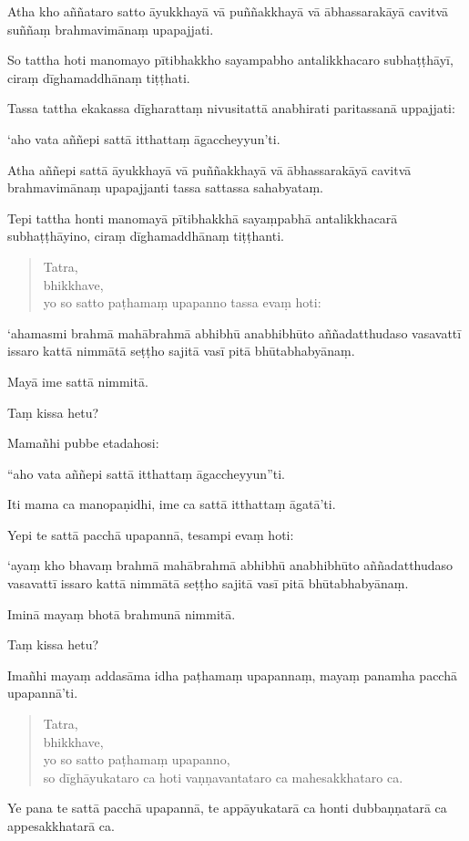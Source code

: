 \documentclass[11pt,twoside,openright]{book}
\begin{document}
\pstart
Atha kho aññataro satto āyukkhayā vā puññakkhayā vā ābhassarakāyā cavitvā suññaṃ brahmavimānaṃ upapajjati.
\pend

\pstart
So tattha hoti manomayo pītibhakkho sayampabho antalikkhacaro subhaṭṭhāyī, ciraṃ dīghamaddhānaṃ tiṭṭhati.
\pend

\pstart
Tassa tattha ekakassa dīgharattaṃ nivusitattā anabhirati paritassanā uppajjati:
\pend

\pstart
‘aho vata aññepi sattā itthattaṃ āgaccheyyun’ti.
\pend

\pstart
Atha aññepi sattā āyukkhayā vā puññakkhayā vā ābhassarakāyā cavitvā brahmavimānaṃ upapajjanti tassa sattassa sahabyataṃ.
\pend

\pstart
Tepi tattha honti manomayā pītibhakkhā sayaṃpabhā antalikkhacarā subhaṭṭhāyino, ciraṃ dīghamaddhānaṃ tiṭṭhanti.
\pend

\begin{verse}
Tatra,\\
\vin  bhikkhave,\\
\vin  yo so satto paṭhamaṃ upapanno tassa evaṃ hoti:

\end{verse}
\pstart
‘ahamasmi brahmā mahābrahmā abhibhū anabhibhūto aññadatthudaso vasavattī issaro kattā nimmātā seṭṭho sajitā vasī pitā bhūtabhabyānaṃ.
\pend

\pstart
Mayā ime sattā nimmitā.
\pend

\pstart
Taṃ kissa hetu?
\pend

\pstart
Mamañhi pubbe etadahosi:
\pend

\pstart
“aho vata aññepi sattā itthattaṃ āgaccheyyun”ti.
\pend

\pstart
Iti mama ca manopaṇidhi, ime ca sattā itthattaṃ āgatā’ti.
\pend

\pstart
Yepi te sattā pacchā upapannā, tesampi evaṃ hoti:
\pend

\pstart
‘ayaṃ kho bhavaṃ brahmā mahābrahmā abhibhū anabhibhūto aññadatthudaso vasavattī issaro kattā nimmātā seṭṭho sajitā vasī pitā bhūtabhabyānaṃ.
\pend

\pstart
Iminā mayaṃ bhotā brahmunā nimmitā.
\pend

\pstart
Taṃ kissa hetu?
\pend

\pstart
Imañhi mayaṃ addasāma idha paṭhamaṃ upapannaṃ, mayaṃ panamha pacchā upapannā’ti.
\pend

\begin{verse}
Tatra,\\
\vin  bhikkhave,\\
\vin  yo so satto paṭhamaṃ upapanno,\\
\vin  so dīghāyukataro ca hoti vaṇṇavantataro ca mahesakkhataro ca.

\end{verse}
\pstart
Ye pana te sattā pacchā upapannā, te appāyukatarā ca honti dubbaṇṇatarā ca appesakkhatarā ca.
\pend
\end{document}
